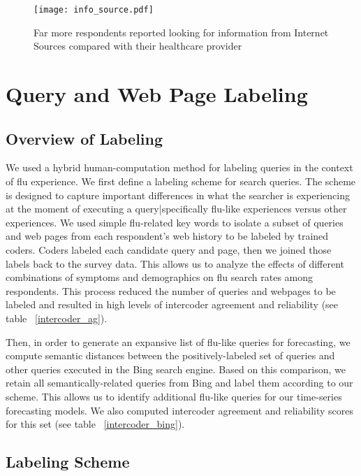\documentclass[12pt]{article}
\begin{document}
\begin{figure}[!htbp]
\begin{centering}
   \texttt{[image: info\_source.pdf]}
  \caption{Far more respondents reported looking for information from Internet Sources compared with their healthcare provider}
\label{info_source}
\end{centering}
\end{figure}


\section{Query and Web Page Labeling}

\subsection{Overview of Labeling}
We used a hybrid human-computation method for labeling queries in the context of flu experience. We first define a labeling scheme for search queries. The scheme is designed to capture important differences in what the searcher is experiencing at the moment of executing a query|specifically flu-like experiences versus other experiences.
We used simple flu-related key words to isolate a subset of queries and web pages from each respondent's web history to be labeled by trained coders. Coders labeled each candidate query and page, then we joined those labels back to the survey data. This allows us to analyze the effects of different combinations of symptoms and demographics on flu search rates among respondents. This process reduced the number of queries and webpages to be labeled and resulted in high levels of intercoder agreement and reliability (see table ~\ref{intercoder_ag}).

Then, in order to generate an expansive list of flu-like queries for forecasting, we compute semantic distances between the positively-labeled set of queries and other queries executed in the Bing search engine. Based on this comparison, we retain all semantically-related queries from Bing and label them according to our scheme. This allows us to identify additional flu-like queries for our time-series forecasting models. We also computed intercoder agreement and reliability scores for this set (see table ~\ref{intercoder_bing}).

\subsection{Labeling Scheme}
\end{document}
